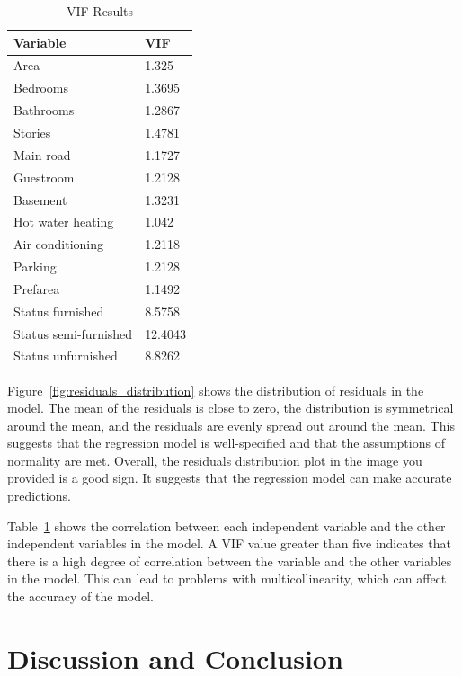 \documentclass[12pt]{article}
\begin{document}
\begin{table}[h!]
\caption{VIF Results}
  \label{tab:ree}
 \begin{center} 
\begin{tabular}{ll}
  \toprule
Variable & VIF \\
  \midrule
Area & 1.325 \\ 
Bedrooms & 1.3695 \\
Bathrooms & 1.2867 \\
Stories & 1.4781 \\
Main road & 1.1727 \\
Guestroom & 1.2128 \\
Basement & 1.3231 \\
Hot water heating & 1.042 \\
Air conditioning & 1.2118 \\
Parking & 1.2128 \\
Prefarea & 1.1492 \\
Status furnished & 8.5758 \\
Status semi-furnished & 12.4043 \\
Status unfurnished & 8.8262 \\
   \bottomrule
\end{tabular}\par
\end{center}

\end{table}
Figure~\ref{fig:residuals_distribution} shows the distribution of residuals in the model. The mean of the residuals is close to zero, the distribution is symmetrical around the mean, and the residuals are evenly spread out around the mean. This suggests that the regression model is well-specified and that the assumptions of normality are met. Overall, the residuals distribution plot in the image you provided is a good sign. It suggests that the regression model can make accurate predictions.


Table~\ref{tab:ree} shows the correlation between each independent variable and the other independent variables in the model. A VIF value greater than five indicates that there is a high degree of correlation between the variable and the other variables in the model. This can lead to problems with multicollinearity, which can affect the accuracy of the model.

\section{Discussion and Conclusion}
\label{sec:disc}
\end{document}
